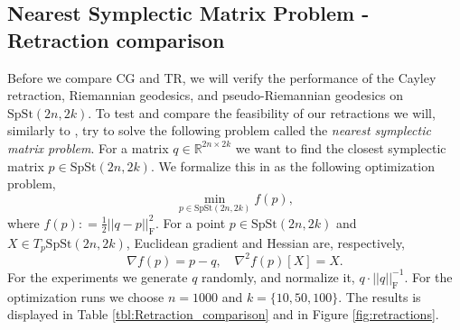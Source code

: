 \subsection{Nearest Symplectic Matrix Problem - Retraction comparison}
Before we compare CG and TR, we will verify the performance of the Cayley retraction, Riemannian geodesics, and pseudo-Riemannian geodesics on $\mathrm{SpSt}(2n, 2k)$. 
To test and compare the feasibility of our retractions we will, similarly to \cite[p.~25]{BendokatZimmermann2021}, try to solve the following problem called the \textit{nearest symplectic matrix problem}. For a matrix $q\in \mathbb{R}^{2n\times2k}$ we want to find the closest symplectic matrix $p \in \mathrm{SpSt}(2n, 2k)$. We formalize this in as the following optimization problem, 
%
\begin{equation}
\operatorname*{min}_{p \in \mathrm{SpSt}(2n, 2k)}f(p),
\end{equation}
%
where $f(p)\colon=\tfrac{1}{2}\lvert \lvert q-p \rvert \rvert^{2}_{\text{F}}$. For a point $p\in \mathrm{SpSt}(2n, 2k)$ and $X\in T_{p}\mathrm{SpSt}(2n, 2k)$, Euclidean gradient and Hessian are, respectively,
%
\begin{equation*}
\nabla f(p)=p-q,\quad \nabla^{2}f(p)[X]=X.
\end{equation*}
%
For the experiments we generate $q$ randomly, and normalize it, $q\cdot\lvert \lvert q \rvert \rvert^{-1}_{\text{F}}$. For the optimization runs we choose $n=1000$ and $k=\{10,50,100\}$. The results is displayed in Table \ref{tbl:Retraction_comparison} and in Figure \ref{fig:retractions}. 


